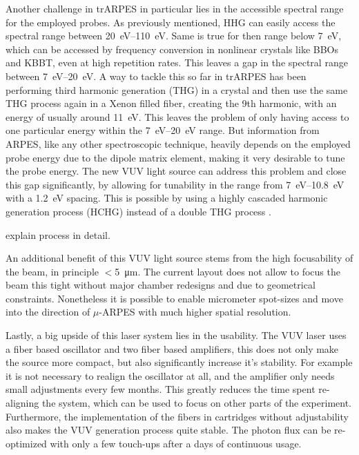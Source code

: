 Another challenge in trARPES in particular lies in the accessible spectral range for the employed probes.
As previously mentioned, HHG can easily access the spectral range between \qtyrange{20}{110}{\electronvolt}.
Same is true for then range below \qty{7}{\electronvolt}, which can be accessed  by frequency conversion in nonlinear crystals like BBOs and KBBT, even at high repetition rates.
This leaves a gap in the spectral range between \qtyrange{7}{20}{\electronvolt}.
A way to tackle this so far in trARPES has been performing third harmonic generation (THG) in a crystal and then use the same THG process again in a Xenon filled fiber, creating the 9th harmonic, with an energy of usually around \qty{11}{\electronvolt}.
This leaves the problem of only having access to one particular energy within the \qtyrange{7}{20}{\electronvolt} range.
But information from ARPES, like any other spectroscopic technique, heavily depends on the employed probe energy due to the dipole matrix element, making it very desirable to tune the probe energy.
The new VUV light source can address this problem and close this gap significantly, by allowing for tunability in the range from \qtyrange{7}{10.8}{\electronvolt} with a \qty{1.2}{\electronvolt} spacing.
This is possible by using a highly cascaded harmonic generation process (HCHG) instead of a double THG process \cite{}.

explain process in detail.

An additional benefit of this VUV light source stems from the high focusability of the beam, in principle $<$\qty{5}{\micro\meter}.
The current layout does not allow to focus the beam this tight without major chamber redesigns and due to geometrical constraints.
Nonetheless it is possible to enable micrometer spot-sizes and move into the direction of $\mu$-ARPES with much higher spatial resolution.

Lastly, a big upside of this laser system lies in the usability.
The VUV laser uses a fiber based oscillator and two fiber based amplifiers, this does not only make the source more compact, but also significantly increase it's stability.
For example it is not necessary to realign the oscillator at all, and the amplifier only needs small adjustments every few months.
This greatly reduces the time spent re-aligning the system, which can be used to focus on other parts of the experiment.
Furthermore, the implementation of the fibers in cartridges without adjustability also makes the VUV generation process quite stable.
The photon flux can be re-optimized with only a few touch-ups after a days of continuous usage.

